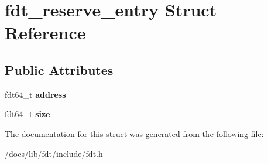 \hypertarget{structfdt__reserve__entry}{}\section{fdt\+\_\+reserve\+\_\+entry Struct Reference}
\label{structfdt__reserve__entry}
\subsection*{Public Attributes}
\begin{DoxyCompactItemize}
\item 
\mbox{\label{structfdt__reserve__entry_a1453319ff97e2d7c2ec0762cee56e98e}} 
fdt64\+\_\+t {\bfseries address}
\item 
\mbox{\label{structfdt__reserve__entry_ace12399f157bc46877fbcddec98da67e}} 
fdt64\+\_\+t {\bfseries size}
\end{DoxyCompactItemize}


The documentation for this struct was generated from the following file\+:\begin{DoxyCompactItemize}
\item 
/docs/lib/fdt/include/fdt.\+h\end{DoxyCompactItemize}

